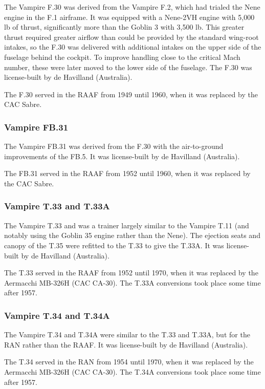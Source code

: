 The Vampire F.30 was derived from the Vampire F.2, which had trialed the Nene engine in the F.1 airframe. It was equipped with a Nene-2VH engine with 5,000 lb of thrust, significantly more than the Goblin 3 with 3,500 lb. This greater thrust required greater airflow than could be provided by the standard wing-root intakes, so the F.30 was delivered with additional intakes on the upper side of the fuselage behind the cockpit. To improve handling close to the critical Mach number, these were later moved to the lower side of the fuselage. The F.30 was license-built by de Havilland (Australia).

The F.30 served in the RAAF from 1949 until 1960, when it was replaced by the CAC Sabre.

\subsubsection{Vampire FB.31}

The Vampire FB.31 was derived from the F.30 with the air-to-ground improvements of the FB.5. It was license-built by de Havilland (Australia).

The FB.31 served in the RAAF from 1952 until 1960, when it was replaced by the CAC Sabre.

\subsubsection{Vampire T.33 and T.33A}

The Vampire T.33 and was a trainer largely similar to the Vampire T.11 (and notably using the Goblin 35 engine rather than the Nene). The ejection seats and canopy of the T.35 were refitted to the T.33 to give the T.33A. It was license-built by de Havilland (Australia).

The T.33 served in the RAAF from 1952 until 1970, when it was replaced by the Aermacchi MB-326H (CAC CA-30). The T.33A conversions took place some time after 1957.

\subsubsection{Vampire T.34 and T.34A}

The Vampire T.34 and T.34A were similar to the T.33 and T.33A, but for the RAN rather than the RAAF. It was license-built by de Havilland (Australia).

The T.34 served in the RAN from 1954 until 1970, when it was replaced by the Aermacchi MB-326H (CAC CA-30). The T.34A conversions took place some time after 1957.

